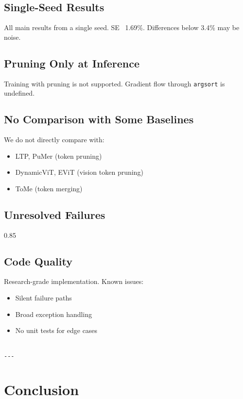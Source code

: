 \subsection{Single-Seed Results}

All main results from a single seed. SE ~1.69\%. Differences below 3.4\% 
may be noise.

\subsection{Pruning Only at Inference}

Training with pruning is not supported. Gradient flow through \texttt{argsort} 
is undefined.

\subsection{No Comparison with Some Baselines}

We do not directly compare with:

\begin{itemize}
\item LTP, PuMer (token pruning)
\item DynamicViT, EViT (vision token pruning)
\item ToMe (token merging)

\end{itemize}
\subsection{Unresolved Failures}

0.85

\subsection{Code Quality}

Research-grade implementation. Known issues:

\begin{itemize}
\item Silent failure paths
\item Broad exception handling
\item No unit tests for edge cases
\end{itemize}
\begin{lstlisting}

---
\end{lstlisting}


\section{Conclusion}

